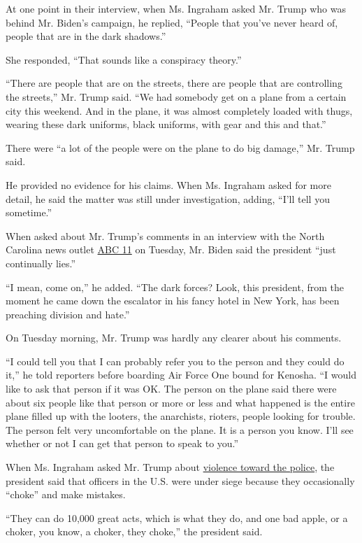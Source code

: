 At one point in their interview, when Ms. Ingraham asked Mr. Trump who
was behind Mr. Biden's campaign, he replied, ``People that you've never
heard of, people that are in the dark shadows.''

She responded, ``That sounds like a conspiracy theory.''

``There are people that are on the streets, there are people that are
controlling the streets,'' Mr. Trump said. ``We had somebody get on a
plane from a certain city this weekend. And in the plane, it was almost
completely loaded with thugs, wearing these dark uniforms, black
uniforms, with gear and this and that.''

There were ``a lot of the people were on the plane to do big damage,''
Mr. Trump said.

He provided no evidence for his claims. When Ms. Ingraham asked for more
detail, he said the matter was still under investigation, adding, ``I'll
tell you sometime.''

When asked about Mr. Trump's comments in an interview with the North
Carolina news outlet
\href{https://abc11.com/politics/former-vp-biden-on-potential-visit-to-nc-i-promise-you-im-coming/6399535/}{ABC
11} on Tuesday, Mr. Biden said the president ``just continually lies.''

``I mean, come on,'' he added. ``The dark forces? Look, this president,
from the moment he came down the escalator in his fancy hotel in New
York, has been preaching division and hate.''

On Tuesday morning, Mr. Trump was hardly any clearer about his comments.

``I could tell you that I can probably refer you to the person and they
could do it,'' he told reporters before boarding Air Force One bound for
Kenosha. ``I would like to ask that person if it was OK. The person on
the plane said there were about six people like that person or more or
less and what happened is the entire plane filled up with the looters,
the anarchists, rioters, people looking for trouble. The person felt
very uncomfortable on the plane. It is a person you know. I'll see
whether or not I can get that person to speak to you.''

When Ms. Ingraham asked Mr. Trump about
\href{https://www.cnn.com/2020/08/31/us/st-louis-police-officer-dies/index.html}{violence
toward the police}, the president said that officers in the U.S. were
under siege because they occasionally ``choke'' and make mistakes.

``They can do 10,000 great acts, which is what they do, and one bad
apple, or a choker, you know, a choker, they choke,'' the president
said.

